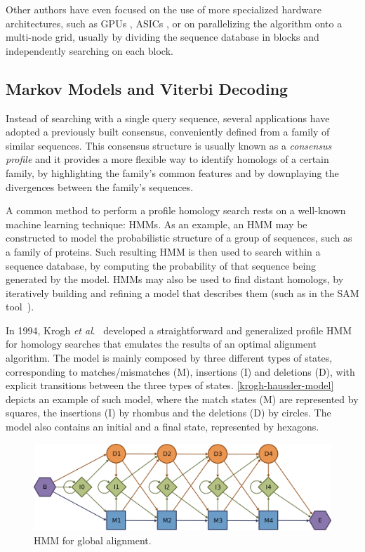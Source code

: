 \documentclass{bmcart}
\begin{document}
Other authors have even focused on the use of more specialized hardware architectures, such as GPUs \cite{gpus}, ASICs \cite{fpgas}, or on parallelizing the algorithm onto a multi-node grid, usually by dividing the sequence database in blocks and independently searching on each block.

\subsection*{Markov Models and Viterbi Decoding}

Instead of searching with a single query sequence, several applications have adopted a previously built consensus, conveniently defined from a family of similar sequences. This consensus structure is usually known as a \textit{consensus profile} and it provides a more flexible way to identify homologs of a certain family, by highlighting the family's common features and by downplaying the divergences between the family's sequences.

A common method to perform a profile homology search rests on a well-known machine learning technique: \acp{HMM}. As an example, an \ac{HMM} may be constructed to model the probabilistic structure of a group of sequences, such as a family of proteins. Such resulting \ac{HMM} is then used to search within a sequence database, by computing the probability of that sequence being generated by the model.
\acp{HMM} may also be used to find distant homologs, by iteratively building and refining a model that describes them (such as in the SAM tool~\cite{sam}).

In 1994, Krogh \emph{et al}.~\cite{krogh1994} developed a
straightforward and generalized profile \ac{HMM}  for homology searches that emulates the results of an optimal alignment algorithm. The model is mainly composed by three different types of states, corresponding to matches/mismatches (M), insertions (I) and deletions (D), with explicit transitions between the three types of states. \autoref{krogh-haussler-model} depicts an example of such model, where the match states (M) are represented by squares, the insertions (I) by rhombus and the deletions (D) by circles. The model also contains an initial and a final state, represented by hexagons.

\begin{figure}[h!]
  \centering
  \includegraphics{img/krogh-haussler-model.eps} 
  \caption{HMM for global alignment.}
  \label{krogh-haussler-model}
\end{figure}
\end{document}
